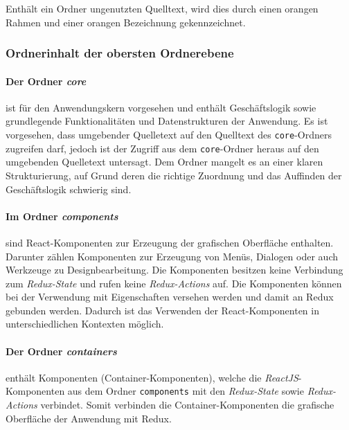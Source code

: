 Enthält ein Ordner ungenutzten Quelltext, wird dies durch einen orangen Rahmen und einer orangen Bezeichnung gekennzeichnet.

\subsubsection{Ordnerinhalt der obersten Ordnerebene}
\paragraph{Der Ordner \emph{core}} ist für den Anwendungskern vorgesehen und enthält Geschäftslogik sowie grundlegende Funktionalitäten und Datenstrukturen der Anwendung. 
Es ist vorgesehen, dass umgebender Quelletext auf den Quelltext des \lstinline|core|-Ordners zugreifen darf, jedoch ist der Zugriff aus dem \lstinline|core|-Ordner heraus auf den umgebenden Quelletext untersagt. Dem Ordner mangelt es an einer klaren Strukturierung, auf Grund deren die richtige Zuordnung und das Auffinden der Geschäftslogik schwierig sind. 

\paragraph{Im Ordner \emph{components}} sind React-Komponenten zur Erzeugung der grafischen Oberfläche enthalten. Darunter zählen Komponenten zur Erzeugung von Menüs, Dialogen oder auch Werkzeuge zu Designbearbeitung. Die Komponenten besitzen keine Verbindung zum \emph{Redux-State} und rufen keine \emph{Redux-Actions} auf. Die Komponenten können bei der Verwendung mit Eigenschaften versehen werden und damit an Redux gebunden werden. Dadurch ist das Verwenden der React-Komponenten in unterschiedlichen Kontexten möglich.

\paragraph{Der Ordner \emph{containers}} enthält Komponenten (Container-Komponenten), welche die \emph{ReactJS}-Komponenten aus dem Ordner \lstinline|components| mit den \emph{Redux-State} sowie \emph{Redux-Actions} verbindet. Somit verbinden die Container-Komponenten die grafische Oberfläche der Anwendung mit Redux.



